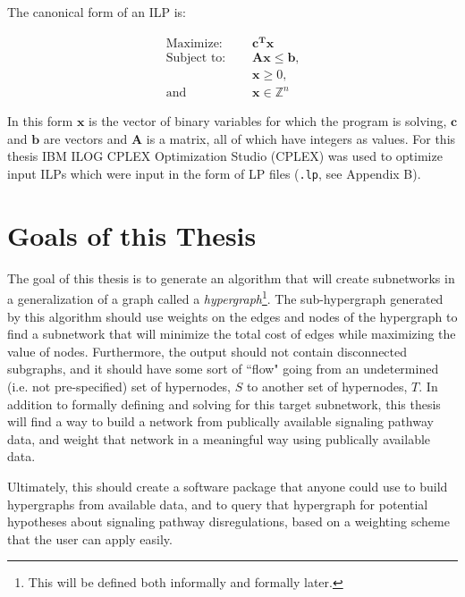 \documentclass[12pt,twoside]{reedthesis}
\theoremstyle{definition}
\begin{document}
  The canonical form of an ILP is:\par

  \begin{align}
    \text{Maximize: }\quad&\mathbf{c^Tx}\label{eq:obj_canonical}\\
    \text{Subject to: }\quad&\mathbf{Ax}\leq\mathbf{b}\text{,}\label{eq:constA}\\
    &\mathbf{x} \geq 0 \text{,}\label{eq:constB}\\
    \text{and } \quad & \mathbf{x} \in \mathbb{Z}^n \label{eq:constC}
  \end{align}

  In this form $\mathbf{x}$ is the vector of binary variables for which the program is solving, $\mathbf{c}$ and $\mathbf{b}$ are vectors and $\mathbf{A}$ is a matrix, all of which have integers as values. For this thesis IBM ILOG CPLEX Optimization Studio (CPLEX) was used to optimize input ILPs which were input in the form of LP files (\texttt{.lp}, see Appendix B).

 \section{Goals of this Thesis}

 The goal of this thesis is to generate an algorithm that will create subnetworks in a generalization of a graph called a \textit{hypergraph}\footnote{This will be defined both informally and formally later.}. The sub-hypergraph generated by this algorithm should use weights on the edges and nodes of the hypergraph to find a subnetwork that will minimize the total cost of edges while maximizing the value of nodes. Furthermore, the output should not contain disconnected subgraphs, and it should have some sort of ``flow" going from an undetermined (i.e. not pre-specified) set of hypernodes, $S$ to another set of hypernodes, $T$. In addition to formally defining and solving for this target subnetwork, this thesis will find a way to build a network from publically available signaling pathway data, and weight that network in a meaningful way using publically available data.\par

 Ultimately, this should create a software package that anyone could use to build hypergraphs from available data, and to query that hypergraph for potential hypotheses about signaling pathway disregulations, based on a weighting scheme that the user can apply easily.\par
\end{document}
